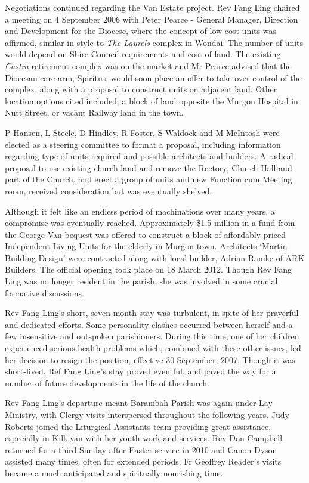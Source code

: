 Negotiations continued regarding the Van Estate project. Rev Fang Ling chaired a meeting on 4 September 2006 with Peter Pearce - General Manager, Direction and Development for the Diocese, where the concept of low-cost units was affirmed, similar in style to \emph{The Laurels} complex in Wondai. The number of units would depend on Shire Council requirements and cost of land. The existing \emph{Castra} retirement complex was on the market and Mr Pearce advised that the Diocesan care arm, Spiritus, would soon place an offer to take over control of the complex, along with a proposal to construct units on adjacent land. Other location options cited included; a block of land opposite the Murgon Hospital in Nutt Street, or vacant Railway land in the town.

P Hansen, L Steele, D Hindley, R Foster, S Waldock and M McIntosh were elected as a steering committee to format a proposal, including information regarding type of units required and possible architects and builders. A radical proposal to use existing church land and remove the Rectory, Church Hall and part of the Church, and erect a group of units and new Function cum Meeting room, received consideration but was eventually shelved.

Although it felt like an endless period of machinations over many years, a compromise was eventually reached. Approximately \$1.5 million in a fund from the George Van bequest was offered to construct a block of affordably priced Independent Living Units for the elderly in Murgon town. Architects `Martin Building Design' were contracted along with local builder, Adrian Ramke of ARK Builders. The official opening took place on 18 March 2012. Though Rev Fang Ling was no longer resident in the parish, she was involved in some crucial formative discussions.

Rev Fang Ling's short, seven-month stay was turbulent, in spite of her prayerful and dedicated efforts. Some personality clashes occurred between herself and a few insensitive and outspoken parishioners. During this time, one of her children experienced serious health problems which, combined with these other issues, led her decision to resign the position, effective 30 September, 2007. Though it was short-lived, Ref Fang Ling's stay proved eventful, and paved the way for a number of future developments in the life of the church.

Rev Fang Ling's departure meant Barambah Parish was again under Lay Ministry, with Clergy visits interspersed throughout the following years. Judy Roberts joined the Liturgical Assistants team providing great assistance, especially in Kilkivan with her youth work and services. Rev Don Campbell returned for a third Sunday after Easter service in 2010 and Canon Dyson assisted many times, often for extended periods. Fr Geoffrey Reader's visits became a much anticipated and spiritually nourishing time.

